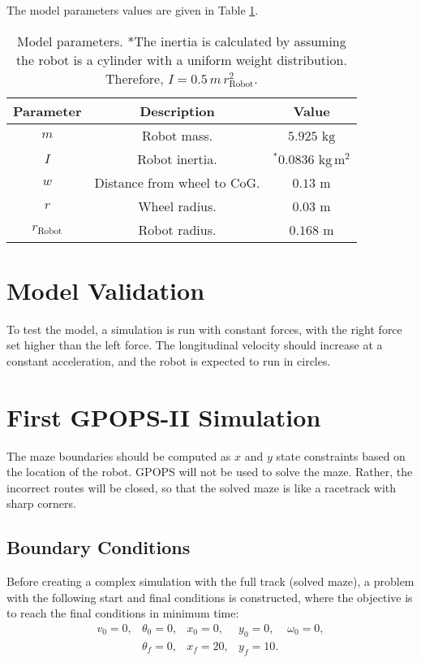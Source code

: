 \documentclass[12pt]{article}
\numberwithin{equation}{section} %
\numberwithin{figure}{section} %
\begin{document}
The model parameters values are given in Table \ref{tab:Model}.
\begin{table}[h!]
	\centering
	\begin{tabular}{c c c}
		\hline
		\textbf{Parameter} & \textbf{Description} & \textbf{Value} \\ \hline
		$m$ & Robot mass. & $5.925$ $\mathrm{kg}$ \\ \hline
		$I$ & Robot inertia. & $^* 0.0836$ $\mathrm{kg \, m^2}$ \\ \hline
		$w$ & Distance from wheel to CoG. & $0.13$ $\mathrm{m}$ \\ \hline
		$r$ & Wheel radius. & $0.03$ $\mathrm{m}$ \\ \hline
		$r_\mathrm{Robot}$ & Robot radius. & $0.168$ $\mathrm{m}$ \\ \hline
	\end{tabular}
	\caption{Model parameters. *The inertia is calculated by assuming the robot is a cylinder with a uniform weight distribution. Therefore, $I = 0.5 \, m \, r_\mathrm{Robot}^2$.}
	\label{tab:Model}
\end{table}

\section{Model Validation}

To test the model, a simulation is run with constant forces, with the right force set higher than the left force. The longitudinal velocity should increase at a constant acceleration, and the robot is expected to run in circles.



\section{First GPOPS-II Simulation}

The maze boundaries should be computed as $x$ and $y$ state constraints based on the location of the robot. GPOPS will not be used to solve the maze. Rather, the incorrect routes will be closed, so that the solved maze is like a racetrack with sharp corners.

\subsection{Boundary Conditions}

Before creating a complex simulation with the full track (solved maze), a problem with the following start and final conditions is constructed, where the objective is to reach the final conditions in minimum time:
\begin{equation}
	\begin{matrix}
		v_0 = 0, & \theta_0 = 0, & x_0 = 0, & y_0 = 0, & \omega_0 = 0, \\
		& \theta_f = 0, & x_f = 20, & y_f = 10. &
	\end{matrix} \nonumber
\end{equation}
\end{document}
